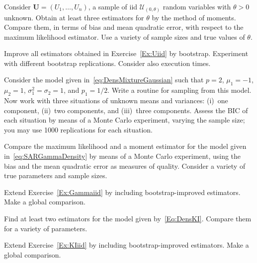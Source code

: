 \begin{exer}\label{Ex:Uiid}
Consider $\bm U=(U_1,\dots,U_n)$, a sample of iid $\mathcal U_{(0,\theta)}$ random variables with $\theta>0$ unknown.
Obtain at least three estimators for $\theta$ by the method of moments.
Compare them, in terms of bias and mean quadratic error, with respect to the maximum likelihood estimator.
Use a variety of sample sizes and true values of $\theta$.
\end{exer}

\begin{exer}
Improve all estimators obtained in Exercise~\ref{Ex:Uiid} by bootstrap.
Experiment with different bootstrap replications.
Consider also execution times.
\end{exer}

\begin{exer}
Consider the model given in~\eqref{eq:DensMixtureGaussian} such that $p=2$, $\mu_1=-1$, $\mu_2=1$, $\sigma_1^2=\sigma_2=1$, and $p_1=1/2$.
Write a routine for sampling from this model.
Now work with three situations of unknown means and variances:
(i)~one component, (ii)~two components, and (iii)~three components.
Assess the BIC of each situation by means of a Monte Carlo experiment, varying the sample size; you may use \num{1000} replications for each situation.
\end{exer}

\begin{exer}\label{Ex:Gammaiid}
Compare the maximum likelihood and a moment estimator for the model given in~\eqref{eq:SARGammaDensity} by means of a Monte Carlo experiment, using the bias and the mean quadratic error as measures of quality.
Consider a variety of true parameters and sample sizes.
\end{exer}

\begin{exer}
Extend Exercise~\ref{Ex:Gammaiid} by including bootstrap-improved estimators.
Make a global comparison.
\end{exer}

\begin{exer}\label{Ex:KIiid}
Find at least two estimators for the model given by~\eqref{Eq:DensKI}.
Compare them for a variety of parameters.
\end{exer}

\begin{exer}
Extend Exercise~\ref{Ex:KIiid} by including bootstrap-improved estimators.
Make a global comparison.
\end{exer}
